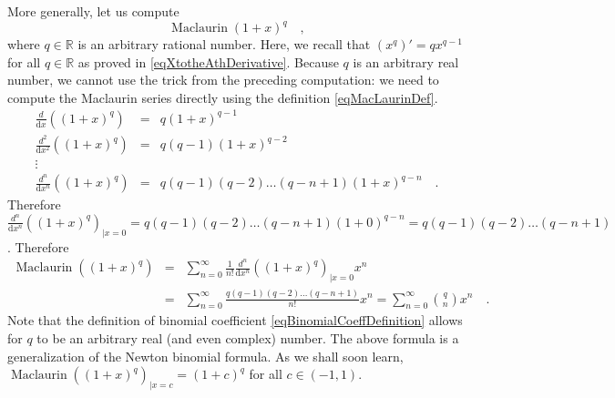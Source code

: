 \documentclass[12pt]{book}
\newcommand{\diff}{\text{d}}
\DeclareMathOperator{\maclaurin}{Maclaurin}
\begin{document}
More generally, let us compute 
\[
\maclaurin (1+x)^q\quad , 
\]
where $q\in \mathbb R$ is an arbitrary rational number. Here, we recall that $(x^q)'=qx^{q-1}$ for all $q\in \mathbb R$ as proved in \eqref{eqXtotheAthDerivative}. Because $q$ is an arbitrary real number, we cannot use the trick from the preceding computation: we need to compute the Maclaurin series directly using the definition \eqref{eqMacLaurinDef}. 
\[
\begin{array}{rcl}
\frac{d}{\diff x}\left( (1+x)^q\right)&=& q (1+x)^{q-1}\\
\frac{d^{2}}{\diff x^2}\left( (1+x)^q\right)&=& q(q-1) (1+x)^{q-2}\\
\vdots \\
\frac{d^{n}}{\diff x^n}\left( (1+x)^q\right)&=& q(q-1)(q-2)\dots (q-n+1) (1+x)^{q-n}\quad .
\end{array}
\]
Therefore $\frac{d^{n}}{\diff x^n}\left( (1+x)^q\right)_{|x=0}=q(q-1)(q-2)\dots (q-n+1) (1+0)^{q-n}= q(q-1)(q-2)\dots (q-n+1)  $. Therefore 
\begin{equation}\label{eqNewtonBinomialGeneralized}
\begin{array}{rcl}
\displaystyle \maclaurin \left( (1+x)^q\right) &=& \displaystyle\sum_{ n=0}^{\infty}\frac{ 1}{n!}\frac{d^n }{\diff x^n} \left( (1+x)^q\right)_{|x=0} x^n  \\ &=&\displaystyle \sum_{n=0}^{\infty}  \frac{q(q-1)(q-2)\dots (q-n+1)}{n!}x^n= \sum_{n=0}^{\infty} \binom{q}{n}x^n\quad . 
\end{array}
\end{equation}
Note that the definition of binomial coefficient \eqref{eqBinomialCoeffDefinition} allows for $q$ to be an arbitrary real (and even complex) number. The above formula is a generalization of the Newton binomial formula.  As we shall soon learn, $\maclaurin \left( (1+x)^q\right)_{|x=c} =(1+c)^q $   for all $c\in (-1, 1)$.
\end{document}

